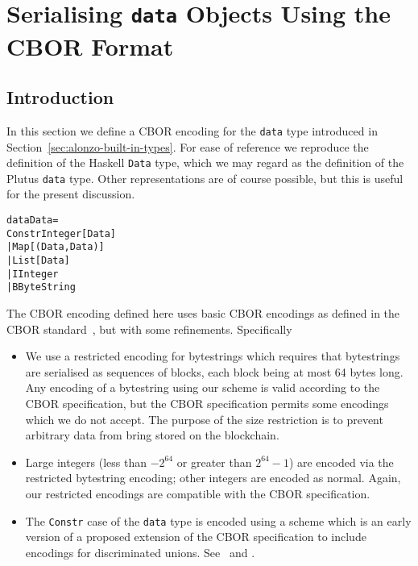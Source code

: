 \section{Serialising \texttt{data} Objects Using the CBOR Format}
\label{appendix:data-cbor-encoding}

\subsection{Introduction}
In this section we define a CBOR encoding for the \texttt{data} type introduced
in Section~\ref{sec:alonzo-built-in-types}.  For ease of reference we reproduce
the definition of the Haskell \texttt{Data} type, which we may regard as the
definition of the Plutus \texttt{data} type. Other representations are of course
possible, but this is useful for the present discussion.

\begin{alltt}
   data Data =
      Constr Integer [Data]
      | Map [(Data, Data)]
      | List [Data]
      | I Integer
      | B ByteString
\end{alltt}

\noindent The CBOR encoding defined here uses basic CBOR encodings as defined in
the CBOR standard~\cite{rfc8949-CBOR}, but with some refinements. Specifically

\begin{itemize}
\item We use a restricted encoding for bytestrings which requires that
  bytestrings are serialised as sequences of blocks, each block being at most 64
  bytes long.  Any encoding of a bytestring using our scheme is valid according
  to the CBOR specification, but the CBOR specification permits some encodings
  which we do not accept. The purpose of the size restriction is to prevent
  arbitrary data from bring stored on the blockchain.
\item Large integers (less than $-2^{64}$ or greater than $2^{64}-1$) are
  encoded via the restricted bytestring encoding; other integers are encoded as
  normal. Again, our restricted encodings are compatible with the CBOR
  specification.
\item The \texttt{Constr} case of the \texttt{data} type is encoded using a
  scheme which is an early version of a proposed extension of the CBOR
  specification to include encodings for discriminated unions.
  See~\cite{CBOR-alternatives} and \cite[Section 9.1]{CBOR-notable-tags}.
  \end{itemize}


